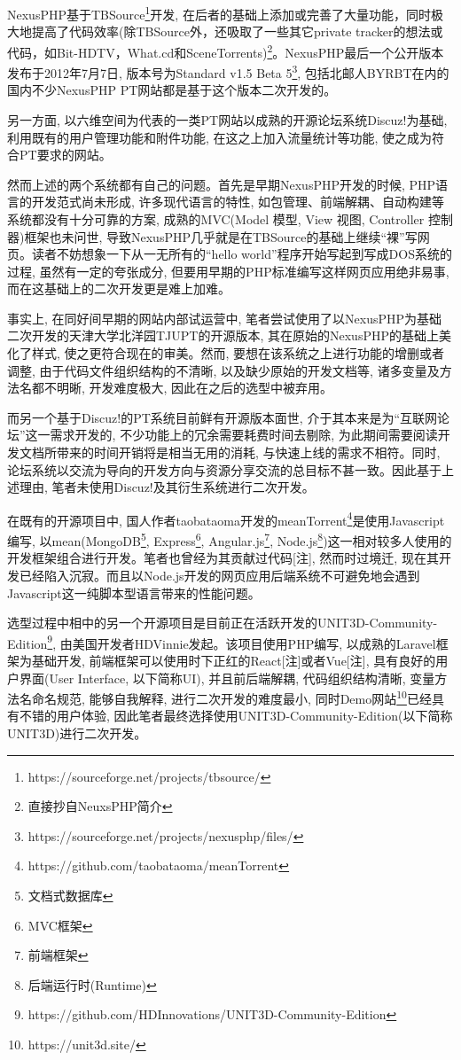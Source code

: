 NexusPHP基于TBSource\footnote{https://sourceforge.net/projects/tbsource/}开发, 在后者的基础上添加或完善了大量功能，同时极大地提高了代码效率(除TBSource外，还吸取了一些其它private tracker的想法或代码，如Bit-HDTV，What.cd和SceneTorrents)\footnote{直接抄自NeuxsPHP简介}。NexusPHP最后一个公开版本发布于2012年7月7日, 版本号为Standard v1.5 Beta 5\footnote{https://sourceforge.net/projects/nexusphp/files/}, 包括北邮人BYRBT在内的国内不少NexusPHP PT网站都是基于这个版本二次开发的。

另一方面, 以六维空间为代表的一类PT网站以成熟的开源论坛系统Discuz!为基础, 利用既有的用户管理功能和附件功能, 在这之上加入流量统计等功能, 使之成为符合PT要求的网站。

然而上述的两个系统都有自己的问题。首先是早期NexusPHP开发的时候, PHP语言的开发范式尚未形成, 许多现代语言的特性, 如包管理、前端解耦、自动构建等系统都没有十分可靠的方案, 成熟的MVC(Model 模型, View 视图, Controller 控制器)框架也未问世, 导致NexusPHP几乎就是在TBSource的基础上继续``裸''写网页。读者不妨想象一下从一无所有的``hello world''程序开始写起到写成DOS系统的过程, 虽然有一定的夸张成分, 但要用早期的PHP标准编写这样网页应用绝非易事, 而在这基础上的二次开发更是难上加难。

事实上, 在同好间早期的网站内部试运营中, 笔者尝试使用了以NexusPHP为基础二次开发的天津大学北洋园TJUPT的开源版本, 其在原始的NexusPHP的基础上美化了样式, 使之更符合现在的审美。然而, 要想在该系统之上进行功能的增删或者调整, 由于代码文件组织结构的不清晰, 以及缺少原始的开发文档等, 诸多变量及方法名都不明晰, 开发难度极大, 因此在之后的选型中被弃用。

而另一个基于Discuz!的PT系统目前鲜有开源版本面世, 介于其本来是为``互联网论坛''这一需求开发的, 不少功能上的冗余需要耗费时间去剔除, 为此期间需要阅读开发文档所带来的时间开销将是相当无用的消耗, 与快速上线的需求不相符。同时, 论坛系统以交流为导向的开发方向与资源分享交流的总目标不甚一致。因此基于上述理由, 笔者未使用Discuz!及其衍生系统进行二次开发。

在既有的开源项目中, 国人作者taobataoma开发的meanTorrent\footnote{https://github.com/taobataoma/meanTorrent}是使用Javascript编写, 以mean(MongoDB\footnote{文档式数据库}, Express\footnote{MVC框架}, Angular.js\footnote{前端框架}, Node.js\footnote{后端运行时(Runtime)})这一相对较多人使用的开发框架组合进行开发。笔者也曾经为其贡献过代码[注], 然而时过境迁, 现在其开发已经陷入沉寂。而且以Node.js开发的网页应用后端系统不可避免地会遇到Javascript这一纯脚本型语言带来的性能问题。

选型过程中相中的另一个开源项目是目前正在活跃开发的UNIT3D-Community-Edition\footnote{https://github.com/HDInnovations/UNIT3D-Community-Edition}, 由美国开发者HDVinnie发起。该项目使用PHP编写, 以成熟的Laravel框架为基础开发, 前端框架可以使用时下正红的React[注]或者Vue[注], 具有良好的用户界面(User Interface, 以下简称UI), 并且前后端解耦, 代码组织结构清晰, 变量方法名命名规范, 能够自我解释, 进行二次开发的难度最小, 同时Demo网站\footnote{https://unit3d.site/}已经具有不错的用户体验, 因此笔者最终选择使用UNIT3D-Community-Edition(以下简称UNIT3D)进行二次开发。

